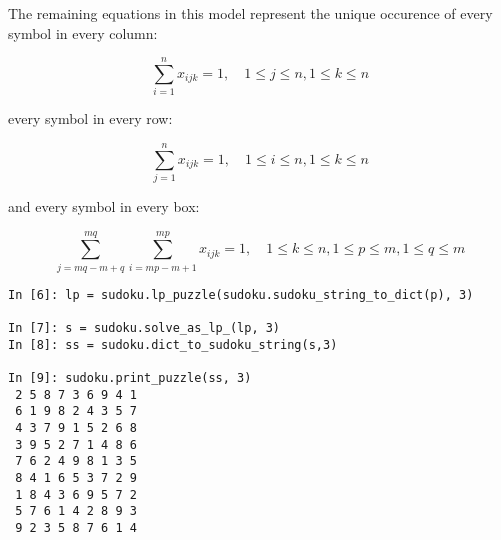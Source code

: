 The remaining equations in this model represent the unique occurence of every symbol in every column:

\begin{equation}
 \sum_{i = 1}^{n} x_{ijk} = 1, \quad 1 \leq j \leq n, 1 \leq k \leq n
\end{equation}

every symbol in every row:

\begin{equation}
 \sum_{j = 1}^{n} x_{ijk} = 1, \quad 1 \leq i \leq n, 1 \leq k \leq n
\end{equation}

and every symbol in every box:

\begin{equation}
 \sum_{j = mq - m + q}^{mq} \sum_{i = mp - m + 1}^{mp} x_{ijk} = 1, \quad 1 \leq k \leq n, 1 \leq p \leq m, 1 \leq q \leq m
\end{equation}

\begin{lstlisting}[caption=Solving a Sudoku via LP model,label=constraintdemo]
In [6]: lp = sudoku.lp_puzzle(sudoku.sudoku_string_to_dict(p), 3)

In [7]: s = sudoku.solve_as_lp_(lp, 3)
In [8]: ss = sudoku.dict_to_sudoku_string(s,3)

In [9]: sudoku.print_puzzle(ss, 3)
 2 5 8 7 3 6 9 4 1 
 6 1 9 8 2 4 3 5 7 
 4 3 7 9 1 5 2 6 8 
 3 9 5 2 7 1 4 8 6 
 7 6 2 4 9 8 1 3 5 
 8 4 1 6 5 3 7 2 9 
 1 8 4 3 6 9 5 7 2 
 5 7 6 1 4 2 8 9 3 
 9 2 3 5 8 7 6 1 4 

\end{lstlisting}


